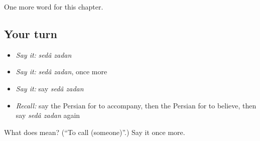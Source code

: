 \begin{grammarlens}[title={What you've built}]
One more word for this chapter.
\end{grammarlens}

\subsection*{Your turn}
\begin{itemize}
\raggedright
  \item \emph{Say it:} \emph{sedâ zadan}
  \item \emph{Say it:} \emph{sedâ zadan}, once more
  \item \emph{Say it:} say \emph{sedâ zadan}
  \item \emph{Recall:} say the Persian for to accompany, then the Persian for to believe, then say \emph{sedâ zadan} again
\end{itemize}

\begin{tcolorbox}[breakable,colback=teal!4,colframe=teal!35!black,title={Before you move on}]
What does   mean? (\textquotedblleft{}To call (someone)\textquotedblright{}.) Say it once more.
\end{tcolorbox}

